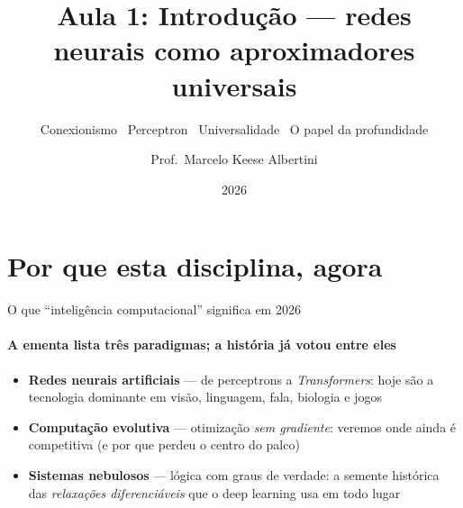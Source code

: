 \documentclass[aspectratio=169, 11pt]{beamer}
\title[Aula 1 — Introdução]{Aula 1: Introdução — redes neurais como aproximadores universais}
\subtitle[GBC073 — Inteligência Computacional]{Conexionismo \textbullet\ Perceptron \textbullet\ Universalidade \textbullet\ O papel da profundidade}
\author[Prof.\ Marcelo Albertini]{Prof.\ Marcelo Keese Albertini}
\institute{GBC073 — Inteligência Computacional \textbullet\ Universidade Federal de Uberlândia}
\date{2026}
\begin{document}
\begin{frame}
  \titlepage
\end{frame}

\section{Por que esta disciplina, agora}

\begin{frame}{O que ``inteligência computacional'' significa em 2026}
  \framesubtitle{A ementa lista três paradigmas; a história já votou entre eles}

  \begin{itemize}\setlength{\itemsep}{0.3ex}
    \item<1-> {\color{icNeural}\textbf{Redes neurais artificiais}} — de perceptrons
          a \emph{Transformers}: hoje são \alert{a} tecnologia dominante em visão,
          linguagem, fala, biologia e jogos
    \item<2-> {\color{icEvol}\textbf{Computação evolutiva}} — otimização
          \emph{sem gradiente}: veremos onde ainda é competitiva (e por que
          perdeu o centro do palco)
    \item<3-> {\color{icFuzzy}\textbf{Sistemas nebulosos}} — lógica com graus de
          verdade: a semente histórica das \emph{relaxações diferenciáveis}
          que o deep learning usa em todo lugar
  \end{itemize}

\end{frame}
\end{document}
